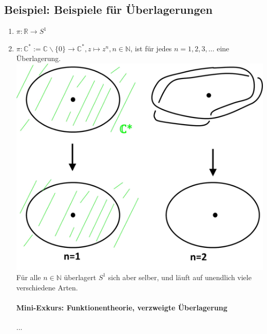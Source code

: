 \documentclass[a4paper,11pt,notitlepage]{report}
\theoremstyle{definition}
\newcommand{\R}{{\ensuremath{\mathbb{R}}}}
\newcommand{\N}{{\ensuremath{\mathbb{N}}}}
\newcommand{\C}{{\ensuremath{\mathbb{C}}}}
\newenvironment{bsp}[1]
{
\setlength{\fboxsep}{10pt}
\subsection*{Beispiel: #1}
\begin{upshape}
}
{
\end{upshape}
}
\begin{document}
\begin{bsp}{Beispiele für Überlagerungen}
\begin{enumerate}
	\item $\pi \colon \R \rightarrow S^1$
	\item $\pi \colon \C^* := \C \backslash \{0\} \rightarrow \C^*, z \mapsto z^n, n \in \N$, ist für jedes $n = 1, 2, 3, \ldots$ eine Überlagerung. \newline
	\includegraphics[scale=0.4]{images/Selbstueberlagerung_C_Stern.png} \newline
	Für alle $n \in \N$ überlagert $S^1$ sich aber selber, und läuft auf unendlich viele verschiedene Arten.
	\paragraph{Mini-Exkurs: Funktionentheorie, verzweigte Überlagerung}...
\end{enumerate}
\end{bsp}
\end{document}
